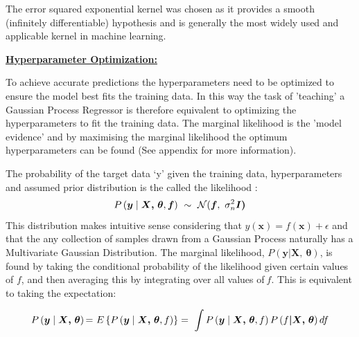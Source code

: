 \documentclass[10.5pt,a4paper,twoside]{report}   %
\begin{document}
The error squared exponential kernel was chosen as it provides a smooth (infinitely differentiable) hypothesis and is generally the most widely used and applicable kernel in machine learning.

\noindent \underline{\textbf{Hyperparameter Optimization:}}

To achieve accurate predictions the hyperparameters need to be optimized to ensure the model best fits the training data. In this way the task of 'teaching' a Gaussian Process Regressor is therefore equivalent to optimizing the hyperparameters to fit the training data. The marginal likelihood is the 'model evidence' and by maximising the marginal likelihood the optimum hyperparameters can be found (See appendix for more information)\cite{MITGPRbook,GPROpt,camgpr,edsnelgpr}.


The probability of the target data `y' given the training data, hyperparameters and assumed prior distribution is the called the likelihood \cite{camgpr,edsnelgpr}: 
\begin{equation}
P\left(\boldsymbol{y}\mathrel{\left|\vphantom{\boldsymbol{y} \boldsymbol{X}\boldsymbol{,\ }\boldsymbol{\theta },\boldsymbol{f}}\right.\kern-\nulldelimiterspace}\boldsymbol{X}\boldsymbol{,\ }\boldsymbol{\theta },\boldsymbol{f}\right)\ \sim \ \mathcal{N}(\boldsymbol{f},\ {\sigma }^2_n\boldsymbol{I}\boldsymbol{)}
\end{equation}
 This distribution makes intuitive sense considering that $y(\boldsymbol{x})=f(\boldsymbol{x})+\epsilon$  \cite{MITGPRbook,UManMND} and that the any collection of samples drawn from a Gaussian Process naturally has a Multivariate Gaussian Distribution. The marginal likelihood, $P(\boldsymbol{y}\boldsymbol{|}\boldsymbol{X}\boldsymbol{,\ }\boldsymbol{\theta })$,  is found by taking the conditional probability of the likelihood given certain values of $f$, and then averaging this by integrating over all values of$\ f$. This is equivalent to taking the expectation:
 
\begin{equation}
P\left(\boldsymbol{y}\mathrel{\left|\vphantom{\boldsymbol{y} \boldsymbol{X}\boldsymbol{,\ }\boldsymbol{\theta }}\right.\kern-\nulldelimiterspace}\boldsymbol{X}\boldsymbol{,\ }\boldsymbol{\theta }\right){\rm =}{\rm \ }E\left\{P\left(\boldsymbol{y}\mathrel{\left|\vphantom{\boldsymbol{y} \boldsymbol{X}\boldsymbol{,\ }\boldsymbol{\theta },f}\right.\kern-\nulldelimiterspace}\boldsymbol{X}\boldsymbol{,\ }\boldsymbol{\theta },f\right)\right\}=\ \int{P\left(\boldsymbol{y}\mathrel{\left|\vphantom{\boldsymbol{y} \boldsymbol{X}\boldsymbol{,\ }\boldsymbol{\theta },f}\right.\kern-\nulldelimiterspace}\boldsymbol{X}\boldsymbol{,\ }\boldsymbol{\theta },f\right)P\left(f\boldsymbol{|}\boldsymbol{X}\boldsymbol{,\ }\boldsymbol{\theta }\right)df}
\end{equation}
\end{document}
